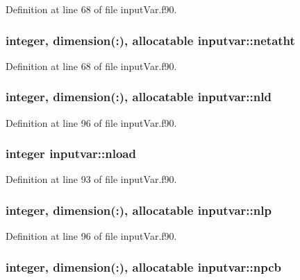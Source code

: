 Definition at line 68 of file input\-Var.\-f90.

\hypertarget{classinputvar_acebcf3d64f116183dd364e920288729f}{
\subsubsection[{netatht}]{\setlength{\rightskip}{0pt plus 5cm}integer, dimension(\-:), allocatable inputvar\-::netatht}}\label{classinputvar_acebcf3d64f116183dd364e920288729f}


Definition at line 68 of file input\-Var.\-f90.

\hypertarget{classinputvar_a8c5a23a5a519fb86c67fc1465aef0e33}{
\subsubsection[{nld}]{\setlength{\rightskip}{0pt plus 5cm}integer, dimension(\-:), allocatable inputvar\-::nld}}\label{classinputvar_a8c5a23a5a519fb86c67fc1465aef0e33}


Definition at line 96 of file input\-Var.\-f90.

\hypertarget{classinputvar_ac924c0b7af6a3dbae99f1a60dc9242ab}{
\subsubsection[{nload}]{\setlength{\rightskip}{0pt plus 5cm}integer inputvar\-::nload}}\label{classinputvar_ac924c0b7af6a3dbae99f1a60dc9242ab}


Definition at line 93 of file input\-Var.\-f90.

\hypertarget{classinputvar_a3f2f71983b35bd63596385392671f89d}{
\subsubsection[{nlp}]{\setlength{\rightskip}{0pt plus 5cm}integer, dimension(\-:), allocatable inputvar\-::nlp}}\label{classinputvar_a3f2f71983b35bd63596385392671f89d}


Definition at line 96 of file input\-Var.\-f90.

\hypertarget{classinputvar_a4f83c89634ccb8f94fca08a023648791}{
\subsubsection[{npcb}]{\setlength{\rightskip}{0pt plus 5cm}integer, dimension(\-:), allocatable inputvar\-::npcb}}\label{classinputvar_a4f83c89634ccb8f94fca08a023648791}



